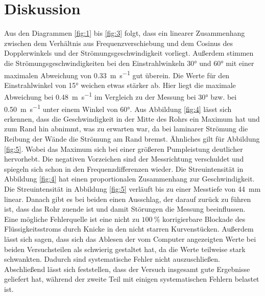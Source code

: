 \documentclass[
  bibliography=totoc,     %
  captions=tableheading,  %
  titlepage=firstiscover, %
]{scrartcl}
\begin{document}
\section{Diskussion}
Aus den Diagrammen \ref{fig:1} bis \ref{fig:3} folgt, dass ein linearer
Zusammenhang
zwischen dem Verhältnis aus Frequenzverschiebung und dem Cosinus des
Dopplerwinkels und
der Strömungsgeschwindigkeit vorliegt. Außerdem stimmen die
Strömungsgeschwindigkeiten bei
den Einstrahlwinkeln 30° und 60° mit einer maximalen Abweichung von
\SI{0.33}{\meter\per\second}
gut überein. Die Werte für den Einstrahlwinkel von 15° weichen etwas stärker
ab. Hier liegt die
maximale Abweichung bei \SI{0.48}{\meter\per\second} im Vergleich zu der
Messung bei 30°
bzw. bei \SI{0.50}{\meter\per\second} unter einem Winkel von 60°.
Aus Abbildung \ref{fig:4} lässt sich erkennen, dass die Geschwindigkeit in der
Mitte des Rohrs ein Maximum hat und zum Rand hin abnimmt, was zu erwarten war,
da bei laminarer Strömung die Reibung der Wände die Strömung am Rand bremst.
Ähnliches gilt für Abbildung \ref{fig:5}. Wobei das Maximum sich
bei einer größeren Pumpleistung deutlicher hervorhebt. Die negativen Vorzeichen
sind der Messrichtung verschuldet und spiegeln sich schon in den Frequenzdifferenzen
wieder. Die Streuintensität in Abbildung \ref{fig:4} hat einen proportionalen
Zusammenhang zur Geschwindigkeit. Die Streuintensität in Abbildung \ref{fig:5}
verläuft bis zu einer Messtiefe von \SI{44}{\milli\meter} linear.
Danach gibt es bei beiden einen Ausschlag, der darauf zurück zu führen ist, dass
das Rohr zuende ist und damit Störungen die Messung beeinflussen.
Eine mögliche Fehlerquelle ist eine nicht zu $\SI{100}{\percent}$ korrigierbare
Blockade des Flüssigkeitsstroms durch Knicke in den nicht starren Kurvenstücken.
Außerdem lässt sich sagen, dass sich das Ablesen der vom Computer angezeigten
Werte bei beiden Versuchsteilen als schwierig gestaltet hat, da die Werte
teilweise stark schwankten. Dadurch sind systematische Fehler nicht auszuschließen.
Abschließend lässt sich feststellen, dass der Versuch insgesamt gute Ergebnisse
geliefert hat, während der zweite Teil mit einigen systematischen
Fehlern belastet ist.
\newpage
\nocite{*}
\printbibliography
\end{document}
